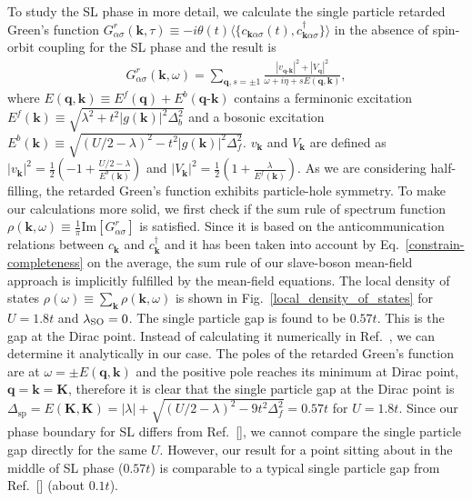 \documentclass[aps,prb,twocolumn,superscriptaddress,showpacs]{revtex4-1}
\begin{document}
To study the SL phase in more detail, we calculate the single particle retarded Green's function $G^{r}_{\alpha\sigma}(\textbf{k},\tau) \equiv -i\theta(t)\langle \{ c_{\textbf{k}\alpha\sigma}(t),c^{\dag}_{\textbf{k}\alpha\sigma}\} \rangle $ in the absence of spin-orbit coupling for the SL phase and the result is
\begin{eqnarray}
G^{r}_{\alpha\sigma}(\textbf{k},\omega)=\sum_{\textbf{q},s=\pm1}   \frac{|v_{\textbf{q-k}}|^2+|V_{\textbf{q}}|^2}{\omega+i\eta+sE(\textbf{q},\textbf{k})},
\end{eqnarray}
where $E(\textbf{q},\textbf{k}) \equiv E^f(\textbf{q})+E^b(\textbf{q-k})$ contains a ferminonic excitation $E^f(\textbf{k}) \equiv \sqrt{\lambda^2+t^2|g(\textbf{k})|^2\Delta_b^2}$ and a bosonic excitation
$E^b(\textbf{k})\equiv \sqrt{(U/2-\lambda)^2-t^2|g(\textbf{k})|^2\Delta_f^2}$. $v_{\textbf{k}}$ and $V_{\textbf{k}}$ are defined as $|v_{\textbf{k}}|^2=\frac{1}{2}(-1+\frac{U/2-\lambda}{E^b(\textbf{k})})$ and $|V_{\textbf{k}}|^2=\frac{1}{2}(1+\frac{\lambda}{E^f(\textbf{k})})$. As we are considering half-filling, the retarded Green's function exhibits particle-hole symmetry. To make our calculations more solid, we first check if the sum rule of spectrum function $\rho(\textbf{k},\omega) \equiv \frac{1}{\pi}\textrm{Im}[G^{r}_{\alpha\sigma}]$ is satisfied. Since it is based on the anticommunication relations between $c_{\textbf{k}}$ and $c^{\dag}_{\textbf{k}} $ and it has been taken into account by Eq.~\ref{constrain-completeness} on the average, the sum rule of our slave-boson mean-field approach is implicitly fulfilled by the mean-field equations. The local density of states $\rho(\omega) \equiv \sum_{\textbf{k}} \rho(\textbf{k},\omega)$ is shown in Fig.~\ref{local_density_of_states} for $U=1.8t$ and $\lambda_{\rm{SO}}=0$. The single particle gap is found to be $0.57t$. This is the gap at the Dirac point. Instead of calculating it numerically in Ref.~, we can determine it analytically in our case. The poles of the retarded Green's function are at $\omega=\pm E(\textbf{q},\textbf{k})$ and the positive pole reaches its minimum at Dirac point, $\textbf{q}=\textbf{k}=\textbf{K}$, therefore it is clear that the single particle gap at the Dirac point is $\Delta_{\textrm{sp}}=E(\textbf{K},\textbf{K})=|\lambda|+\sqrt{(U/2-\lambda)^2-9t^2\Delta_f^2}=0.57t$ for $U=1.8t$. Since our phase boundary for SL differs from Ref.~[], we cannot compare the single particle gap directly for the same $U$. However, our result for a point sitting about in the middle of SL phase ($0.57t$) is comparable to a typical single particle gap from Ref.~[] (about $0.1t$).
\end{document}
